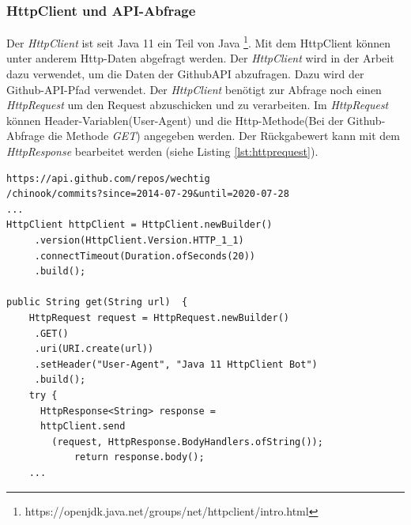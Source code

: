 \subsubsection{HttpClient und API-Abfrage}
Der \textit{HttpClient} ist seit Java 11 ein Teil von Java \footnote{https://openjdk.java.net/groups/net/httpclient/intro.html}. Mit dem HttpClient können unter anderem Http-Daten abgefragt werden. Der \textit{HttpClient} wird in der Arbeit dazu verwendet, um die Daten der GithubAPI abzufragen. Dazu wird der Github-API-Pfad verwendet. Der \textit{HttpClient} benötigt zur Abfrage noch einen \textit{HttpRequest} um den Request abzuschicken und zu verarbeiten. Im \textit{HttpRequest} können Header-Variablen(User-Agent) und die Http-Methode(Bei der Github-Abfrage die Methode \textit{GET}) angegeben werden. Der Rückgabewert kann mit dem \textit{HttpResponse} bearbeitet werden (siehe Listing   \ref{lst:httprequest}).
\lstset{
  caption=[Listing für die Implementierung für die Abfrage der Github-API und Beispiel-Request.]{Listing für die Implementierung für die Abfrage der Github-API.}, 
  basicstyle=\small\ttfamily, 
  label=lst:httprequest, 
  language=Java,
  frame=single,
  breaklines=true, %
  postbreak=\mbox{\textcolor{red}{$\hookrightarrow$}\space},
}
\begin{samepage}%
	\begin{lstlisting}[float=tbhp]
https://api.github.com/repos/wechtig
/chinook/commits?since=2014-07-29&until=2020-07-28
...
HttpClient httpClient = HttpClient.newBuilder()
     .version(HttpClient.Version.HTTP_1_1)
     .connectTimeout(Duration.ofSeconds(20))
     .build();

public String get(String url)  {
    HttpRequest request = HttpRequest.newBuilder()
     .GET()
     .uri(URI.create(url))
     .setHeader("User-Agent", "Java 11 HttpClient Bot")
     .build();
    try {
      HttpResponse<String> response = 
      httpClient.send
      	(request, HttpResponse.BodyHandlers.ofString());
            return response.body();
	...
	\end{lstlisting}
\end{samepage}
